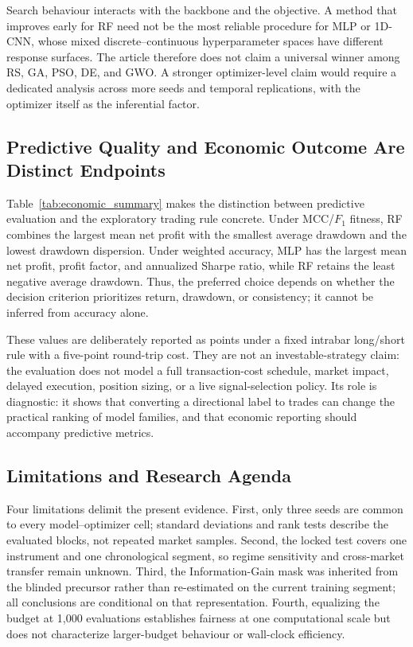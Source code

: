Search behaviour interacts with the backbone and the objective. A method that improves early for RF need not be the most reliable procedure for MLP or 1D-CNN, whose mixed discrete--continuous hyperparameter spaces have different response surfaces. The article therefore does not claim a universal winner among RS, GA, PSO, DE, and GWO. A stronger optimizer-level claim would require a dedicated analysis across more seeds and temporal replications, with the optimizer itself as the inferential factor.

\subsection{Predictive Quality and Economic Outcome Are Distinct Endpoints}

Table~\ref{tab:economic_summary} makes the distinction between predictive evaluation and the exploratory trading rule concrete. Under MCC/$F_1$ fitness, RF combines the largest mean net profit with the smallest average drawdown and the lowest drawdown dispersion. Under weighted accuracy, MLP has the largest mean net profit, profit factor, and annualized Sharpe ratio, while RF retains the least negative average drawdown. Thus, the preferred choice depends on whether the decision criterion prioritizes return, drawdown, or consistency; it cannot be inferred from accuracy alone.

These values are deliberately reported as points under a fixed intrabar long/short rule with a five-point round-trip cost. They are not an investable-strategy claim: the evaluation does not model a full transaction-cost schedule, market impact, delayed execution, position sizing, or a live signal-selection policy. Its role is diagnostic: it shows that converting a directional label to trades can change the practical ranking of model families, and that economic reporting should accompany predictive metrics.

\subsection{Limitations and Research Agenda}

Four limitations delimit the present evidence. First, only three seeds are common to every model--optimizer cell; standard deviations and rank tests describe the evaluated blocks, not repeated market samples. Second, the locked test covers one instrument and one chronological segment, so regime sensitivity and cross-market transfer remain unknown. Third, the Information-Gain mask was inherited from the blinded precursor rather than re-estimated on the current training segment; all conclusions are conditional on that representation. Fourth, equalizing the budget at 1,000 evaluations establishes fairness at one computational scale but does not characterize larger-budget behaviour or wall-clock efficiency.

